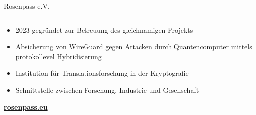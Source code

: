 \begin{frame}{Rosenpass e.V.}
  \begin{columns}[fullwidth,c]

    \begin{column}{.7\linewidth}
      \begin{itemize}
        \item 2023 gegründet zur Betreuung des gleichnamigen Projekts
        \vfill
        \item Absicherung von WireGuard gegen Attacken durch Quantencomputer mittels protokollevel Hybridisierung
        \item Institution für Translationsforschung in der Kryptografie
        \vfill
        \item Schnittstelle zwischen Forschung, Industrie und Gesellschaft
      \end{itemize}
      \bigskip
      \textbf{\url{rosenpass.eu}}
    \end{column}%
  \end{columns}
\end{frame}
